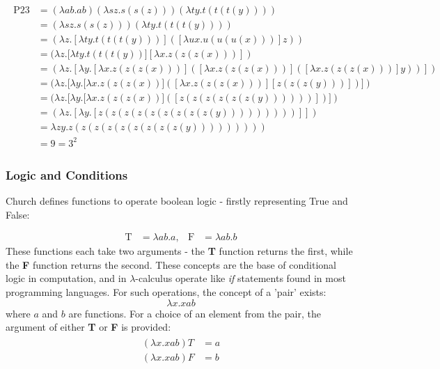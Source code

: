 \documentclass {article}
\begin{document}
\begin{gather*}
\begin{aligned}
\bm{\mathrm{P23}} &= (\lambda ab.ab)(\lambda sz.s(s(z)))(\lambda ty.t(t(t(y))))\\
&= (\lambda sz.s(s(z)))(\lambda ty.t(t(t(y))))\\
&= (\lambda z.[\lambda ty.t(t(t(y)))]([\lambda ux.u(u(u(x)))]z))\\
&= (\lambda z.[\lambda ty.t(t(t(y))][\lambda x.z(z(z(x)))])\\
&= (\lambda z.[\lambda y.[\lambda x.z(z(z(x)))]([\lambda x.z(z(z(x)))]([\lambda x.z(z(z(x)))]y))])\\
&= (\lambda z.[\lambda y.[\lambda x.z(z(z(x))]([\lambda x.z(z(z(x)))][z(z(z(y)))])])\\
&= (\lambda z.[\lambda y.[\lambda x.z(z(z(x))]([z(z(z(z(z(z(y))))))])])\\
&= (\lambda z.[\lambda y.[z(z(z(z(z(z(z(z(z(y)))))))))]])\\
&= \lambda zy.z(z(z(z(z(z(z(z(z(y)))))))))\\
&= \bm{\mathrm{9}} = \bm{\mathrm{3^2}}
\end{aligned}
\end{gather*}

\subsubsection{Logic and Conditions}

    Church defines functions to operate boolean logic - firstly representing True and False:
    
\begin{equation*}
\begin{aligned}
\bm{\mathrm{T}} &= \lambda ab.a,
  & %
\bm{\mathrm{F}} &= \lambda ab.b
\end{aligned}
\end{equation*}
These functions each take two arguments - the \textbf{T} function returns the first, while the \textbf{F} function returns the second.
These concepts are the base of conditional logic in computation, and in $\lambda$-calculus operate like \textit{if} statements found in most programming languages. For such operations, the concept of a 'pair' exists:
\begin{equation*}
\lambda x.xab
\end{equation*}
where $a$ and $b$ are functions. For a choice of an element from the pair, the argument of either \textbf{T} or \textbf{F} is provided:
\begin{gather*}
\begin{aligned}
(\lambda x.xab)T &= a\\
(\lambda x.xab)F &= b
\end{aligned}
\end{gather*}
\end{document}
